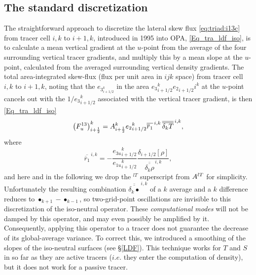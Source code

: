 \documentclass[NEMO_book]{subfiles}
\begin{document}
\subsection{The standard discretization}
The straightforward approach to discretize the lateral skew flux
\eqref{eq:triad:i13c} from tracer cell $i,k$ to $i+1,k$, introduced in 1995
into OPA, \eqref{Eq_tra_ldf_iso}, is to calculate a mean vertical
gradient at the $u$-point from the average of the four surrounding
vertical tracer gradients, and multiply this by a mean slope at the
$u$-point, calculated from the averaged surrounding vertical density
gradients. The total area-integrated skew-flux (flux per unit area in
$ijk$ space) from tracer cell $i,k$
to $i+1,k$, noting that the $e_{{3}_{i+1/2}^k}$ in the area
$e{_{3}}_{i+1/2}^k{e_{2}}_{i+1/2}i^k$ at the $u$-point cancels out with
the $1/{e_{3}}_{i+1/2}^k$ associated with the vertical tracer
gradient, is then \eqref{Eq_tra_ldf_iso}
\begin{equation*}
  \left(F_u^{13} \right)_{i+\scriptstyle\frac{1}{2}}^k = {A}_{i+\scriptstyle\frac{1}{2}}^k
  {e_{2}}_{i+1/2}^k \overline{\overline
    r_1} ^{\,i,k}\,\overline{\overline{\delta_k T}}^{\,i,k},
\end{equation*}
where
\begin{equation*}
  \overline{\overline
   r_1} ^{\,i,k} = -\frac{{e_{3u}}_{i+1/2}^k}{{e_{1u}}_{i+1/2}^k}
  \frac{\delta_{i+1/2} [\rho]}{\overline{\overline{\delta_k \rho}}^{\,i,k}},
\end{equation*}
and here and in the following we drop the $^{lT}$ superscript from
${A^{lT}}$ for simplicity.
Unfortunately the resulting combination $\overline{\overline{\delta_k
    \bullet}}^{\,i,k}$ of a $k$ average and a $k$ difference %
reduces to $\bullet_{k+1}-\bullet_{k-1}$, so two-grid-point oscillations are
invisible to this discretization of the iso-neutral operator. These
\emph{computational modes} will not be damped by this operator, and
may even possibly be amplified by it.  Consequently, applying this
operator to a tracer does not guarantee the decrease of its
global-average variance. To correct this, we introduced a smoothing of
the slopes of the iso-neutral surfaces (see \S\ref{LDF}). This
technique works for $T$ and $S$ in so far as they are active tracers
($i.e.$ they enter the computation of density), but it does not work
for a passive tracer.
\end{document}

